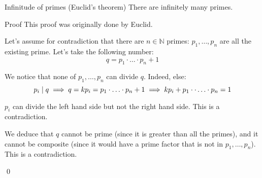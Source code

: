 \documentclass[a4paper]{article}
\begin{document}
\begin{parag}{Infinitude of primes (Euclid's theorem)}
    There are infinitely many primes. 

    \begin{subparag}{Proof}
        This proof was originally done by Euclid. 

        Let's assume for contradiction that there are $n \in \mathbb{N}$ primes: $p_1, \ldots, p_n$  are all the existing prime. Let's take the following number: 
        \[q = p_1\cdot\ldots\cdot p_n + 1\]
        
        We notice that none of $p_1, \ldots, p_n$ can divide $q$. Indeed, else: 
        \[p_i \mid q \implies q = kp_i = p_1\cdot\ldots\cdot p_n + 1 \implies kp_i + p_1 \cdot \cdot \ldots \cdot p_n = 1\]
        
        $p_i$ can divide the left hand side but not the right hand side. This is a contradiction. 

        We deduce that $q$ cannot be prime (since it is greater than all the primes), and it cannot be composite (since it would have a prime factor that is not in $p_1, \ldots, p_n$). This is a contradiction.
  
        \qed
    \end{subparag}
    
\end{parag}
\end{document}
